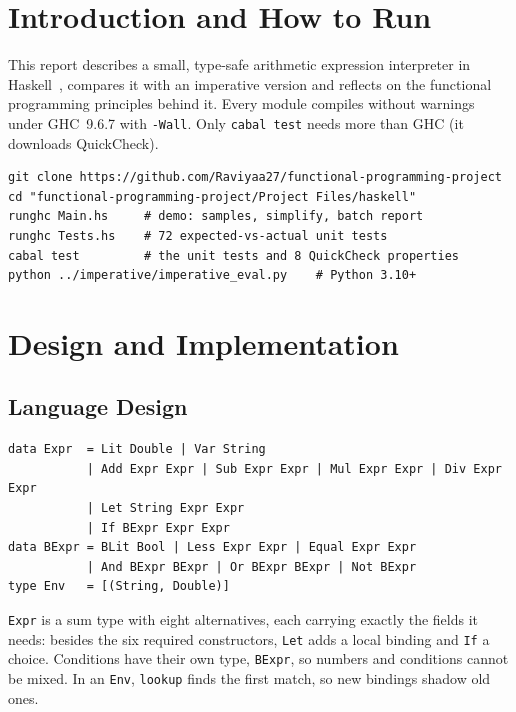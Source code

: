 \documentclass[12pt, a4paper]{report}
\newcommand{\code}[1]{\texttt{#1}}
\begin{document}


\renewcommand{\thepage}{\arabic{page}}
\setcounter{page}{1}

\section{Introduction and How to Run}
This report describes a small, type-safe arithmetic expression interpreter
in Haskell~\cite{hutton2016programming}, compares it with an imperative
version and reflects on the functional programming principles behind it.
Every module compiles without warnings under GHC~9.6.7 with
\code{-Wall}. Only \code{cabal test} needs more than GHC (it downloads
QuickCheck).
\begin{lstlisting}[style=plain]
git clone https://github.com/Raviyaa27/functional-programming-project
cd "functional-programming-project/Project Files/haskell"
runghc Main.hs     # demo: samples, simplify, batch report
runghc Tests.hs    # 72 expected-vs-actual unit tests
cabal test         # the unit tests and 8 QuickCheck properties
python ../imperative/imperative_eval.py    # Python 3.10+
\end{lstlisting}

\section{Design and Implementation}\label{sec:design}
\subsection{Language Design}
\begin{lstlisting}[style=hs, numbers=none, xleftmargin=0pt, framexleftmargin=0pt,
  caption={The expression types (abridged from \code{Expr.hs}, lines 27-47).},
  label=lst:types]
data Expr  = Lit Double | Var String
           | Add Expr Expr | Sub Expr Expr | Mul Expr Expr | Div Expr Expr
           | Let String Expr Expr
           | If BExpr Expr Expr
data BExpr = BLit Bool | Less Expr Expr | Equal Expr Expr
           | And BExpr BExpr | Or BExpr BExpr | Not BExpr
type Env   = [(String, Double)]
\end{lstlisting}
\code{Expr} is a sum type with eight alternatives, each carrying exactly the
fields it needs: besides the six required constructors, \code{Let} adds a
local binding and \code{If} a choice. Conditions have their own type,
\code{BExpr}, so numbers and conditions cannot be mixed. In an \code{Env},
\code{lookup} finds the first match, so new bindings shadow old ones.
\end{document}
